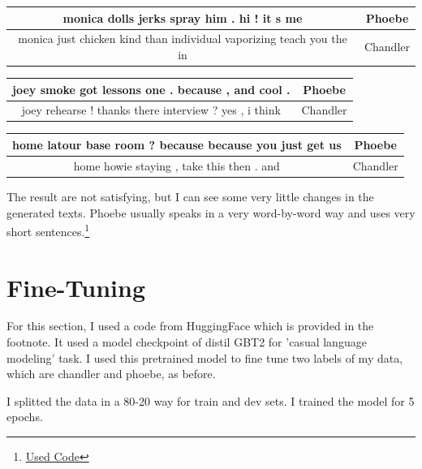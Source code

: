 \documentclass{article}
\begin{document}
\begin{center}
\begin{tabular}{ |c|c| } 
 \hline
 monica dolls jerks spray him . hi ! it s me & Phoebe  \\ 
 \hline
 monica just chicken kind than individual vaporizing teach you the in & Chandler  \\ 
 \hline
\end{tabular}
\end{center}

\begin{center}
\begin{tabular}{ |c|c| } 
 \hline
 joey smoke got lessons one . because , and cool . & Phoebe  \\ 
 \hline
 joey rehearse ! thanks there interview ? yes , i think & Chandler  \\ 
 \hline
\end{tabular}
\end{center}

\begin{center}
\begin{tabular}{ |c|c| } 
 \hline
 home latour base room ? because because you just get us & Phoebe  \\ 
 \hline
 home howie staying , take this then  . and & Chandler \\ 
 \hline
\end{tabular}
\end{center}

\par The result are not satisfying, but I can see some very little changes in the generated texts. Phoebe usually speaks in a very word-by-word way and uses very short sentences.\footnote{\href{https://www.kdnuggets.com/2020/07/pytorch-lstm-text-generation-tutorial.html}{Used Code}}


\section{Fine-Tuning}

\par For this section, I used a code from HuggingFace which is provided in the footnote. It used a model checkpoint of distil GBT2 for 'casual language modeling' task. I used this pretrained model to fine tune two labels of my data, which are chandler and phoebe, as before.

\par I splitted the data in a 80-20 way for train and dev sets. I trained the model for 5 epochs.\\
\end{document}
